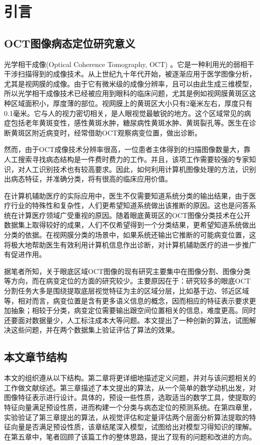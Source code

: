 \chapter{引言}
 
\section{OCT图像病态定位研究意义} %
    光学相干成像(Optical Coherence Tomography, OCT) 。它是一种利用光的弱相干干涉扫描得到的成像技术。从上世纪九十年代开始，被逐渐应用于医学图像分析，尤其是视网膜的成像。由于它有微米级的成像分辨率，且可以由此生成三维模型，所以光学相干成像技术已经被应用到眼科的临床问题，尤其是例如视网膜黄斑区这种区域面积小，厚度薄的部位。视网膜上的黄斑区大小只有2毫米左右，厚度只有0.1毫米。它与人的视力密切相关，是人眼视觉最敏锐的地方。这个区域常见的病症包括老年黄斑变性，感性黄斑水肿，糖尿病性黄斑水肿、黄斑裂孔等。医生在诊断黄斑区附近病变时，经常借助OCT观察病变位置，做出诊断。

    然而，由于OCT成像技术分辨率很高，一位患者主体得到的扫描图像数量大，靠人工搜索寻找病态结构是一件费时费力的工作。并且，该项工作需要较强的专家知识，对人工识别技术也有较高要求。因此，如何利用计算机图像处理的方法，识别出病态特征，并准确分类，将有很高的临床应用价值。
    
    在计算机辅助医疗的实际应用中，医生不仅需要知道系统分类的输出结果，由于医疗行业的特殊性和复杂性，人们更希望知道系统做出该推断的原因。这也是问答系统在计算医疗领域广受重视的原因。随着眼底黄斑区的OCT图像分类技术在公开数据集上取得较好的成果，人们不仅希望得到一个分类结果，更希望知道系统做出分类的依据。在视网膜分类的场景中，如果系统还输出它推断的可能病变位置，这将极大地帮助医生有效利用计算机信息作出诊断，对计算机辅助医疗的进一步推广有促进作用。

    据笔者所知，关于眼底区域OCT图像的现有研究主要集中在图像分割、图像分类等方向，而在病变定位的方面的研究较少。主要原因在于：研究较多的眼底OCT分割任务大多是围绕提取底层视觉特征为主的区域分层，比如基于边、邻近区域等，相对而言，病变位置是含有更多语义信息的概念，因而相应的特征表示要求更加抽象；相较于分类，病变定位需要输出跟空间位置相关的信息，难度更高。同时还要面对数据量少，人工标注成本大等问题。本文提出了一种创新的算法，试图解决这些问题，并在两个数据集上验证评估了算法的效果。

\section{本文章节结构} %
    本文的组织遵从以下结构。第二章将更详细地描述定义问题，并对与该问题相关的工作做文献综述。第三章描述了本文提出的算法，从一个简单的数学动机出发，对图像特征表示进行设计。具体的，预设一些性质，选取适当的数学工具，使提取的特征向量满足预设性质，进而构建一个分类与病态定位的预测系统。在第四章里，实验验证了第三章提出的算法，从视觉评估和定量评估两个层面分析算法提取的特征向量是否满足预设性质，该章结尾深入模型，试图给出对模型习得知识的理解。在第五章中，笔者回顾了该篇工作的整体思路，提出了现有的问题和改进的方向。

